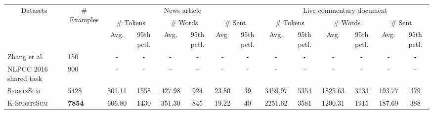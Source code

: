 \begin{table*}[t]
  \centering
  \setlength{\belowcaptionskip}{-10pt}
  \resizebox{0.95\textwidth}{!}
  {
    \begin{tabular}{l|l|cccccc|cccccc}
      \hline
      \multicolumn{1}{c|}{\multirow{3}{*}{Datasets}} & \multicolumn{1}{c|}{\multirow{3}{*}{\# Examples}} & \multicolumn{6}{c|}{News article}                                                             & \multicolumn{6}{c}{Live commentary document}                                                \\
      \multicolumn{1}{c|}{}                         & \multicolumn{1}{c|}{}                             & \multicolumn{2}{c}{\# Tokens} & \multicolumn{2}{c}{\# Words} & \multicolumn{2}{c|}{\# Sent.} & \multicolumn{2}{c}{\# Tokens} & \multicolumn{2}{c}{\# Words} & \multicolumn{2}{c}{\# Sent.} \\
      \multicolumn{1}{c|}{}                         & \multicolumn{1}{c|}{}                             & Avg.         & 95th pctl.      & Avg.        & 95th pctl.     & Avg.        & 95th pctl.      & Avg.         & 95th pctl.      & Avg.        & 95th pctl.     & Avg.        & 95th pctl.     \\ \hline
      Zhang et al.~\cite{zhang-etal-2016-towards}                                  & 150                                               & -            & -               & -           & -              & -           & -               & -            & -               & -           & -              & -           & -              \\ \hline
      NLPCC 2016 shared task~\cite{Wan2016OverviewOT}                        & 900                                               & -            & -               & -           & -              & -           & -               & -            & -               & -           & -              & -           & -              \\ \hline
      \textsc{SportsSum}\cite{Huang2020GeneratingSN}                                     & 5428                                              & 801.11       & 1558               & 427.98      & 924              & 23.80        & 39               & 3459.97      & 5354               & 1825.63     & 3133              & 193.77      & 379              \\ \hline
      \textsc{K-SportsSum}                        & \textbf{7854}                                              & 606.80        & 1430            & 351.30       & 845            & 19.22       & 40              & 2251.62      & 3581            & 1200.31     & 1915           & 187.69      & 388            \\

\end{tabular}}
\end{table*}

